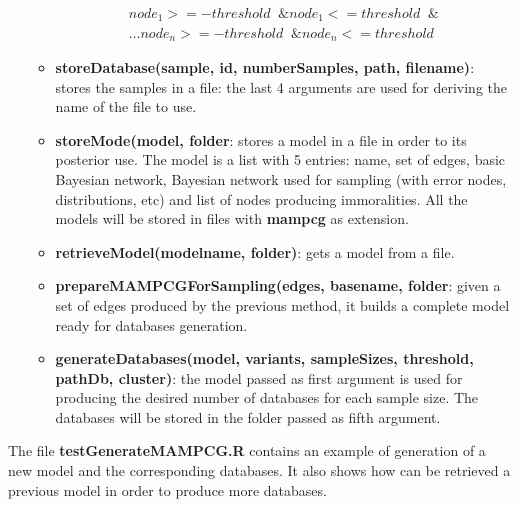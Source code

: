 \documentclass[11pt,professionalfont]{article}
\begin{document}
\begin{itemize}
\begin{itemize}
\begin{multline*}
node_{1} >= - threshold \;\; \& node_{1} <= threshold \;\; \&  \\
\ldots node_{n} >= - threshold \;\; \& node_{n} <= threshold
\end{multline*}

	\item \textbf{storeDatabase(sample, id, numberSamples, path, filename)}:
			stores the samples in a file: the last 4 arguments are used for
			deriving the name of the file to use.

	\item \textbf{storeMode(model, folder}: stores a model in a file in order
			to its posterior use. The model is a list with 5 entries: name,
			set of edges, basic Bayesian network, Bayesian network used for
			sampling (with error nodes, distributions, etc) and list of nodes 
			producing  immoralities. All the models will be stored in files
			with \textbf{mampcg} as extension.

	\item \textbf{retrieveModel(modelname, folder)}: gets a model from a
			file.

	\item \textbf{prepareMAMPCGForSampling(edges, basename, folder}: given a
			set of edges produced by the previous method, it builds a complete
			model ready for databases generation.

	\item \textbf{generateDatabases(model, variants, sampleSizes, threshold,
			pathDb, cluster)}: the model passed as first argument is used for
			producing the desired number of databases for each sample size.
			The databases will be stored in the folder passed as fifth argument.
  \end{itemize}
\end{itemize}

The file \textbf{testGenerateMAMPCG.R} contains an example of generation of
a new model and the corresponding databases. It also shows how can be
retrieved a previous model in order to produce more databases.
\end{document}
